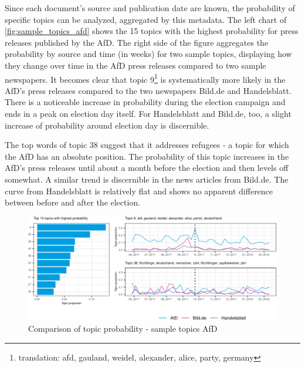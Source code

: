 \documentclass[
  12pt,
]{article}
\begin{document}
Since each document's source and publication date are known, the
probability of specific topics can be analyzed, aggregated by this
metadata. The left chart of \autoref{fig:sample_topics_afd} shows the 15
topics with the highest probability for press releases published by the
AfD. The right side of the figure aggregates the probability by source
and time (in weeks) for two sample topics, displaying how they change
over time in the AfD press releases compared to two sample newspapers.
It becomes clear that topic 9\footnote{translation: afd, gauland,
  weidel, alexander, alice, party, germany} is systematically more
likely in the AfD's press releases compared to the two newspapers
Bild.de and Handelsblatt. There is a noticeable increase in probability
during the election campaign and ends in a peak on election day itself.
For Handelsblatt and Bild.de, too, a slight increase of probability
around election day is discernible.

The top words of topic 38 suggest that it addresses refugees - a topic
for which the AfD has an absolute position. The probability of this
topic increases in the AfD's press releases until about a month before
the election and then levels off somewhat. A similar trend is
discernible in the news articles from Bild.de. The curve from
Handelsblatt is relatively flat and shows no apparent difference between
before and after the election.

\begin{figure}

{\centering \includegraphics[width=1\linewidth]{chap1_files/figure-latex/Top AfD topics-1} 

}

\caption{Comparison of topic probability - sample topics AfD \label{fig:sample_topics_afd}}\label{fig:Top AfD topics}
\end{figure}
\end{document}
